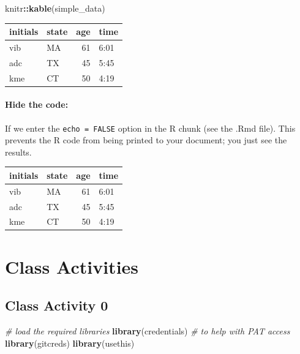 \documentclass[
]{book}
\newenvironment{Shaded}{\begin{snugshade}}{\end{snugshade}}
\newcommand{\CommentTok}[1]{\textcolor[rgb]{0.56,0.35,0.01}{\textit{#1}}}
\newcommand{\FunctionTok}[1]{\textcolor[rgb]{0.13,0.29,0.53}{\textbf{#1}}}
\newcommand{\NormalTok}[1]{#1}
\newcommand{\SpecialCharTok}[1]{\textcolor[rgb]{0.81,0.36,0.00}{\textbf{#1}}}
\begin{document}
\begin{Shaded}
\begin{Highlighting}[]
\NormalTok{knitr}\SpecialCharTok{::}\FunctionTok{kable}\NormalTok{(simple\_data)}
\end{Highlighting}
\end{Shaded}

\begin{tabular}{l|l|r|l}
\hline
initials & state & age & time\\
\hline
vib & MA & 61 & 6:01\\
\hline
adc & TX & 45 & 5:45\\
\hline
kme & CT & 50 & 4:19\\
\hline
\end{tabular}

\hypertarget{hide-the-code}{%
\subsection{Hide the code:}\label{hide-the-code}}

If we enter the \texttt{echo\ =\ FALSE} option in the R chunk (see the .Rmd file). This prevents the R code from being printed to your document; you just see the results.

\begin{tabular}{l|l|r|l}
\hline
initials & state & age & time\\
\hline
vib & MA & 61 & 6:01\\
\hline
adc & TX & 45 & 5:45\\
\hline
kme & CT & 50 & 4:19\\
\hline
\end{tabular}

\hypertarget{part-class-activities}{%
\part*{Class Activities}\label{part-class-activities}}

\hypertarget{class-activity-0}{%
\chapter{Class Activity 0}\label{class-activity-0}}

\begin{Shaded}
\begin{Highlighting}[]
\CommentTok{\# load the required libraries}
\FunctionTok{library}\NormalTok{(credentials) }\CommentTok{\# to help with PAT access}
\FunctionTok{library}\NormalTok{(gitcreds)}
\FunctionTok{library}\NormalTok{(usethis)}
\end{Highlighting}
\end{Shaded}
\end{document}
